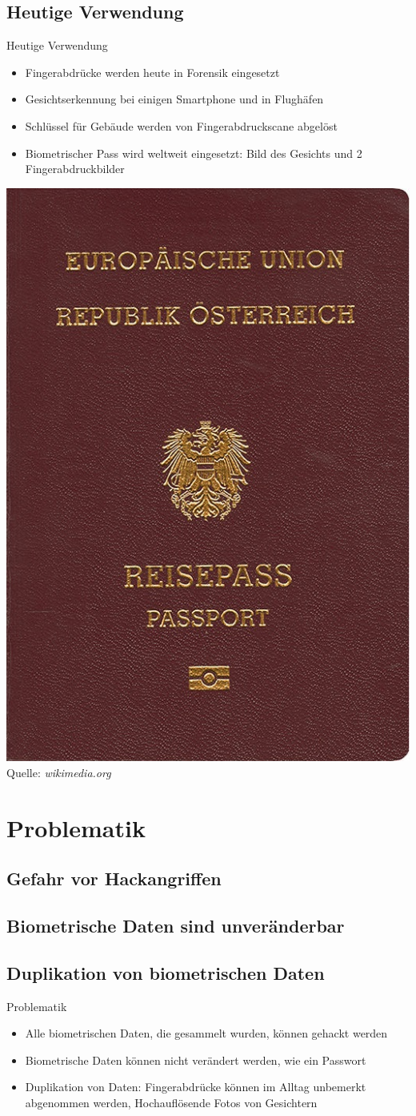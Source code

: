 \documentclass{beamer}
\begin{document}
\subsection{Heutige Verwendung}
\begin{frame}{Heutige Verwendung}
	\begin{itemize}
		\item Fingerabdrücke werden heute in Forensik eingesetzt
		\item Gesichtserkennung bei einigen Smartphone und in Flughäfen
		\item Schlüssel für Gebäude werden von Fingerabdruckscane abgelöst
		\item Biometrischer Pass wird weltweit eingesetzt: Bild des Gesichts und 2 Fingerabdruckbilder \\[2ex]
	\end{itemize}
	\hspace{39mm}\includegraphics [height = 4 cm ]{Reisepass_at.jpg} \\
	\hspace{41mm} \tiny{Quelle: \textit{\tiny{wikimedia.org}}}

\end{frame}

\section{Problematik}
\subsection{Gefahr vor Hackangriffen}
\subsection{Biometrische Daten sind unveränderbar}
\subsection{Duplikation von biometrischen Daten}
\begin{frame}{Problematik}
	\begin{itemize}
		\item Alle biometrischen Daten, die gesammelt wurden, können gehackt werden
		\item Biometrische Daten können nicht verändert werden, wie ein Passwort
		\item Duplikation von Daten: Fingerabdrücke können im Alltag unbemerkt abgenommen werden, Hochauflösende Fotos von Gesichtern
	\end{itemize}
\end{frame}
\end{document}
